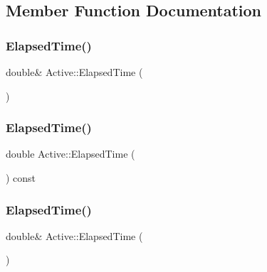 \subsection{Member Function Documentation}
\mbox{\label{struct_active_a61b84526303d31ed5d4d0b64efa15996}} 
\subsubsection{\texorpdfstring{Elapsed\+Time()}{ElapsedTime()}\hspace{0.1cm}{\footnotesize\ttfamily [1/4]}}
{\footnotesize\ttfamily double\& Active\+::\+Elapsed\+Time (\begin{DoxyParamCaption}{ }\end{DoxyParamCaption})\hspace{0.3cm}{\ttfamily [inline]}}

\mbox{\label{struct_active_adc392561063b506262e24bca87a74f43}} 
\subsubsection{\texorpdfstring{Elapsed\+Time()}{ElapsedTime()}\hspace{0.1cm}{\footnotesize\ttfamily [2/4]}}
{\footnotesize\ttfamily double Active\+::\+Elapsed\+Time (\begin{DoxyParamCaption}{ }\end{DoxyParamCaption}) const\hspace{0.3cm}{\ttfamily [inline]}}

\mbox{\label{struct_active_a61b84526303d31ed5d4d0b64efa15996}} 
\subsubsection{\texorpdfstring{Elapsed\+Time()}{ElapsedTime()}\hspace{0.1cm}{\footnotesize\ttfamily [3/4]}}
{\footnotesize\ttfamily double\& Active\+::\+Elapsed\+Time (\begin{DoxyParamCaption}{ }\end{DoxyParamCaption})\hspace{0.3cm}{\ttfamily [inline]}}

